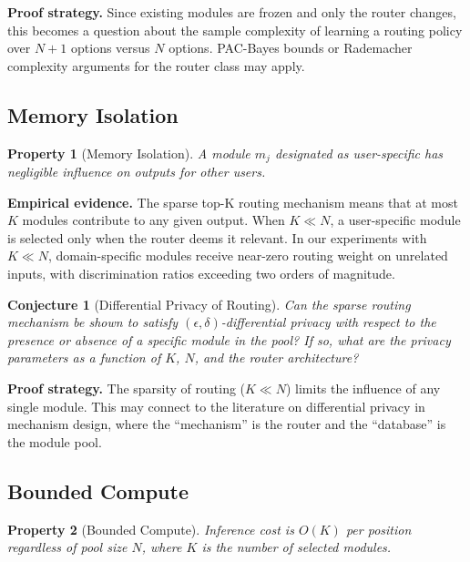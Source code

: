 \documentclass[11pt,a4paper]{article}
\newtheorem{property}{Property}
\newtheorem{conjecture}{Conjecture}
\begin{document}
\noindent\textbf{Proof strategy.} Since existing modules are frozen and only the router changes, this becomes a question about the sample complexity of learning a routing policy over $N+1$ options versus $N$ options. PAC-Bayes bounds or Rademacher complexity arguments for the router class may apply.

\subsection{Memory Isolation}
\label{sec:isolation}

\begin{property}[Memory Isolation]
A module $m_j$ designated as user-specific has negligible influence on outputs for other users.
\end{property}

\noindent\textbf{Empirical evidence.} The sparse top-K routing mechanism means that at most $K$ modules contribute to any given output. When $K \ll N$, a user-specific module is selected only when the router deems it relevant. In our experiments with $K \ll N$, domain-specific modules receive near-zero routing weight on unrelated inputs, with discrimination ratios exceeding two orders of magnitude.

\begin{conjecture}[Differential Privacy of Routing]
Can the sparse routing mechanism be shown to satisfy $(\epsilon, \delta)$-differential privacy with respect to the presence or absence of a specific module in the pool? If so, what are the privacy parameters as a function of $K$, $N$, and the router architecture?
\end{conjecture}

\noindent\textbf{Proof strategy.} The sparsity of routing ($K \ll N$) limits the influence of any single module. This may connect to the literature on differential privacy in mechanism design, where the ``mechanism'' is the router and the ``database'' is the module pool.

\subsection{Bounded Compute}
\label{sec:bounded}

\begin{property}[Bounded Compute]
Inference cost is $O(K)$ per position regardless of pool size $N$, where $K$ is the number of selected modules.
\end{property}
\end{document}
